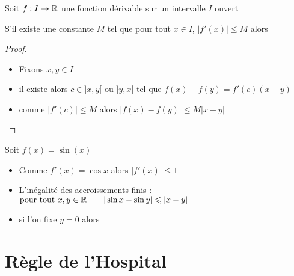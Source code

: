 \begin{frame}

\begin{corollaire}
Soit $f : I \to \mathbb{R}$ une fonction dérivable sur un intervalle $I$ ouvert

S'il existe une constante $M$ tel que pour tout $x \in I$, $\big|f'(x)\big| \le M$ 
alors
\end{corollaire}

\pause

\begin{proof}
\begin{itemize}
  \item Fixons $x,y \in I$
\pause
  \item il existe alors $c\in]x,y[$ ou $]y,x[$ tel que $f(x)-f(y)=f'(c)(x-y)$
\pause
  \item comme $|f'(c)| \le M$ alors $\big| f(x)-f(y) \big| \le M |x-y|$
\end{itemize}
\end{proof}

\end{frame}



\begin{frame}
\begin{exemple}
Soit $f(x)=\sin(x)$
\pause
\begin{itemize}
  \item Comme $f'(x)=\cos x$ alors $|f'(x)| \le 1$
\pause
  \item L'inégalité des accroissements finis :
\pause
$\text{pour tout } x,y \in \mathbb{R} \qquad |\sin x - \sin y | \leqslant |x-y|$
\pause
  \item si l'on fixe $y=0$ alors 
\end{itemize}

\pause
\vspace*{-2ex}
\end{exemple}
\end{frame}



\section*{Règle de l'Hospital}


